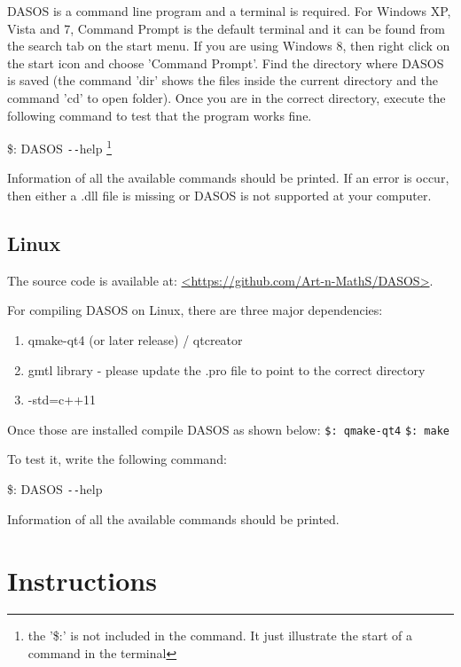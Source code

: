 \documentclass{subfiles}
\begin{document}
		\par DASOS is a command line program and a terminal is required. For Windows XP, Vista and 7,  Command Prompt is the default terminal and it can be found from the search tab on the start menu. If you are using Windows 8, then right click on the start icon and choose 'Command Prompt'. Find the directory where DASOS is saved (the command 'dir' shows the files inside the current directory and the command 'cd' to open folder). Once you are in the correct directory, execute the following command to test that the program works fine. 
		
		\par \$: DASOS \texttt{-{}-}help  \footnote{the '\$:' is not included in the command. It just illustrate the start of a command in the terminal} 
		\par Information of all the available commands should be printed. If an error is occur, then either a .dll file is missing or DASOS is not supported at your computer.
		
		
		\subsection {Linux}
		\par The source code is available at: \url{<https://github.com/Art-n-MathS/DASOS>}.
		\par For compiling DASOS on Linux, there are three major dependencies: 
		\begin{enumerate}
		\item qmake-qt4 (or later release) / qtcreator 
		\item gmtl library - please update the .pro file to point to the correct directory
		\item -std=c++11
		\end{enumerate}
        \par Once those are installed compile DASOS as shown below: \newline
        \verb|$: qmake-qt4| \newline
        \verb|$: make| \newline		

        \par To test it, write the following command: 
        \par \$: DASOS \texttt{-{}-}help  
        \par Information of all the available commands should be printed. 
        

	\section{Instructions}\label{instructions}
\end{document}
